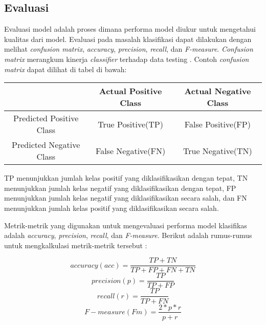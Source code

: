 \documentclass{article}
\begin{document}
   	\subsection{Evaluasi}
   	Evaluasi model adalah proses dimana performa model diukur untuk mengetahui kualitas dari model. Evaluasi pada masalah klasifikasi dapat dilakukan dengan melihat \textit{confusion matrix}, \textit{accuracy}, \textit{precision}, \textit{recall}, dan \textit{F-measure}. \textit{Confusion matrix} merangkum kinerja \textit{classifier} terhadap data testing \cite{hossin}. Contoh \textit{confusion matrix} dapat dilihat di tabel di bawah:
   	
   	\begin{center}
   		\begin{tabular}{|c|c|c|}
   			\hline
   			& Actual Positive Class & Actual Negative Class \\
   			\hline
   			Predicted Positive Class & True Positive(TP) & False Positive(FP) \\
   			\hline
   			Predicted Negative Class & False Negative(FN) & True Negative(TN) \\
   			\hline
   		\end{tabular}
   	\end{center}
   	\par
   	TP menunjukkan jumlah kelas positif yang diklasifikasikan dengan tepat, TN menunjukkan jumlah kelas negatif yang diklasifikasikan dengan tepat, FP menunjukkan jumlah kelas negatif yang diklasifikasikan secara salah, dan FN menunjukkan jumlah kelas positif yang diklasifikasikan secara salah.
   	\par
   	Metrik-metrik yang digunakan untuk mengevaluasi performa model klasifikas adalah \textit{accuracy}, \textit{precision}, \textit{recall}, dan \textit{F-measure}. Berikut adalah rumus-rumus untuk mengkalkulasi metrik-metrik tersebut :
   	
   	\begin{equation}
   		accuracy(acc) = \frac{TP + TN}{TP + FP + FN + TN}
   	\end{equation}
   	\begin{equation}
   		precision(p) = \frac{TP}{TP + FP}
   	\end{equation}
   	\begin{equation}
   		recall(r) = \frac{TP}{TP + FN}
   	\end{equation}
   	\begin{equation}
   		F-measure(Fm) = \frac{2 * p * r}{p + r}
   	\end{equation}
   	
\end{document}
